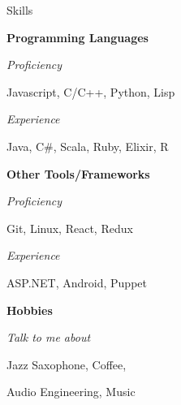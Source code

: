 \begin{minipage}[t]{0.3\textwidth}
  \vspace{10pt}

  {\sectionfont Skills}

  \vspace{5pt}
  \textbf{Programming Languages}
  \begin{adjustwidth}{10pt}{}
    \emph{Proficiency}

    \quad Javascript, C/C++, Python, Lisp

    \emph{Experience}

    \quad Java, C\#, Scala, Ruby, Elixir, R

  \end{adjustwidth}

  \vspace{5pt}
  \textbf{Other Tools/Frameworks}
  \begin{adjustwidth}{10pt}{}
    \emph{Proficiency}

    \quad Git, Linux, React, Redux

    \emph{Experience}

    \quad ASP.NET, Android, Puppet
  \end{adjustwidth}

  \vspace{5pt}
  \textbf{Hobbies}
  \begin{adjustwidth}{10pt}{}
    \emph{Talk to me about}

    \quad Jazz Saxophone, Coffee,

    \quad Audio Engineering, Music
  \end{adjustwidth}















\end{minipage}
